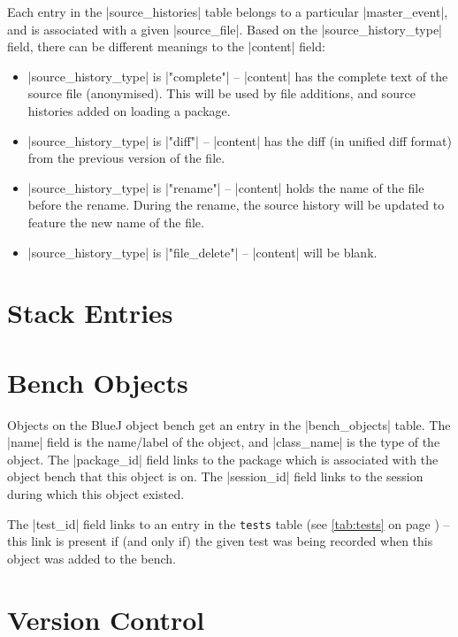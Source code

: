 \documentclass{book}
\newcommand{\myref}[1]{\autoref{#1} on page \pageref*{#1}}
\newcommand{\tabref}[1]{\lstinline|#1| table (see \myref{tab:#1})}
\begin{document}

Each entry in the |source_histories| table belongs to a particular
|master_event|, and is associated with a given |source_file|.  Based on the
|source_history_type| field, there can be different meanings to the |content| field:

\begin{itemize}
\item |source_history_type| is |"complete"| -- |content| has the complete text
  of the source file (anonymised).  This will be
  used by file additions, and source histories added on loading a package.
\item |source_history_type| is |"diff"| -- |content| has the diff (in unified diff format) from
  the previous version of the file.
\item |source_history_type| is |"rename"| -- |content| holds the name of the file before the rename.  During the
  rename, the source history will be updated to feature the new name of the
  file.
\item |source_history_type| is |"file_delete"| -- |content| will be blank.
\end{itemize}

\section{Stack Entries}

\section{Bench Objects}


Objects on the BlueJ object bench get an entry in the |bench_objects|
table.  The |name| field is the name/label of the object, and
|class_name| is the type of the object.  The |package_id| field links
to the package which is associated with the object bench that this
object is on.  The |session_id| field links to the session during
which this object existed.

The |test_id| field links to an entry in the \tabref{tests} -- this
link is present if (and only if) the given test was being recorded
when this object was added to the bench.

\section{Version Control}
\end{document}
